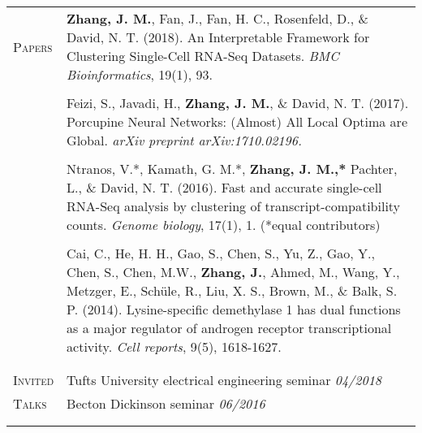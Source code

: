 \documentclass[letterpaper,11pt,oneside]{article}
\begin{document}
\begin{longtable}{@{} p{2.5cm} p{14.8cm}}
 \large{\textsc{Papers}} & \textbf{Zhang, J. M.}, Fan, J., Fan, H. C., Rosenfeld, D., \&  David, N. T. (2018). An Interpretable Framework for Clustering Single-Cell RNA-Seq Datasets. \textit{BMC Bioinformatics}, 19(1), 93. \\
     & \\
     
     & Feizi, S., Javadi, H., \textbf{Zhang, J. M.}, \& David, N. T. (2017). Porcupine Neural Networks: (Almost) All Local Optima are Global. \textit{arXiv preprint arXiv:1710.02196.} \\
 	& \\
 
	& Ntranos, V.*, Kamath, G. M.*, \textbf{Zhang, J. M.,*} Pachter, L., \& David, N. T. (2016). Fast and accurate single-cell RNA-Seq analysis by clustering of transcript-compatibility counts. \textit{Genome biology}, 17(1), 1. (*equal contributors) \\
     & \\
     
     & Cai, C., He, H. H., Gao, S., Chen, S., Yu, Z., Gao, Y., Chen, S., Chen, M.W., \textbf{Zhang, J.}, Ahmed, M., Wang, Y., Metzger, E., Sch\"{u}le, R., Liu, X. S., Brown, M., \& Balk, S. P. (2014). Lysine-specific demethylase 1 has dual functions as a major regulator of androgen receptor transcriptional activity. \textit{Cell reports}, 9(5), 1618-1627. \\
     & \\ 
     & \\
     

 \large{\textsc{Invited}}  & Tufts University electrical engineering seminar  \hfill \textit{04/2018}\\*
 \large{\textsc{Talks}} & Becton Dickinson seminar  \hfill \textit{06/2016} \\
 & \\
 & \\
    


\end{longtable}
\end{document}
